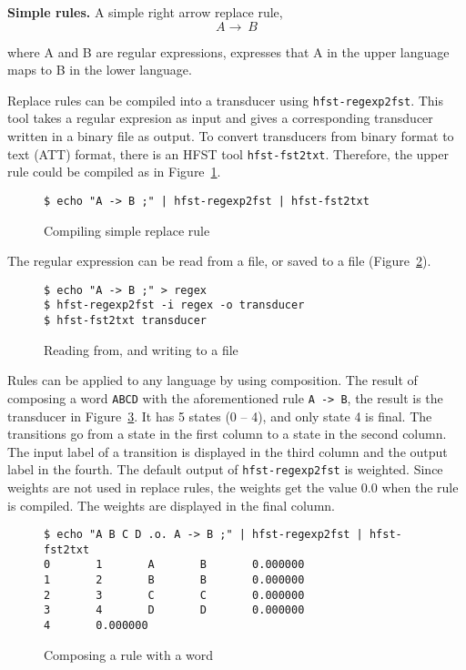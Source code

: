 \documentclass[draft]{llncs}
\begin{document}

\textbf{Simple rules.} A simple right arrow replace rule,
\begin{equation}
  A \rightarrow\ B
\end{equation}

where A and B are regular expressions, 
expresses that A in the upper language maps to B in the lower language.

Replace rules can be compiled into a transducer using
\verb!hfst-regexp2fst!. This tool takes a regular expresion as input 
and gives a corresponding transducer written in a binary file as output. 
To convert transducers from binary format to text (ATT) format, 
there is an HFST tool \verb!hfst-fst2txt!. Therefore, the upper rule 
could be compiled as in Figure~\ref{fig:simple_replace}.

\begin{figure} [h!]
{\footnotesize
\begin{verbatim}
$ echo "A -> B ;" | hfst-regexp2fst | hfst-fst2txt
\end{verbatim}
}
\caption{Compiling simple replace rule}
\label{fig:simple_replace}
\end{figure}


The regular expression can be read from a file, or saved to a file (Figure~\ref{fig:read_from_file}). 

\begin{figure} [h!]
{\footnotesize
\begin{verbatim}
$ echo "A -> B ;" > regex
$ hfst-regexp2fst -i regex -o transducer
$ hfst-fst2txt transducer
\end{verbatim}
}
\caption{Reading from, and writing to a file}
\label{fig:read_from_file}
\end{figure}


Rules can be applied to any language by using composition.
The result of composing a word \verb!ABCD! with the aforementioned rule
\verb!A -> B!, the
result is the transducer in Figure~\ref{fig:replace_compose}.  It has
5 states (0 -- 4), and only state 4 is final. The transitions go from a state in the
first column to a state in the second column. The input label of a transition is
displayed in the third column and the output label in the fourth. The default
output of \verb!hfst-regexp2fst! is weighted. Since weights are
not used in replace rules, the weights get the value 0.0 when the rule is
compiled. The weights are displayed in the final column.

\begin{figure} [h!]
{\footnotesize
\begin{verbatim}
$ echo "A B C D .o. A -> B ;" | hfst-regexp2fst | hfst-fst2txt
0       1       A       B       0.000000
1       2       B       B       0.000000
2       3       C       C       0.000000
3       4       D       D       0.000000
4       0.000000
\end{verbatim}
}
\caption{Composing a rule with a word}
\label{fig:replace_compose}
\end{figure}
\end{document}
